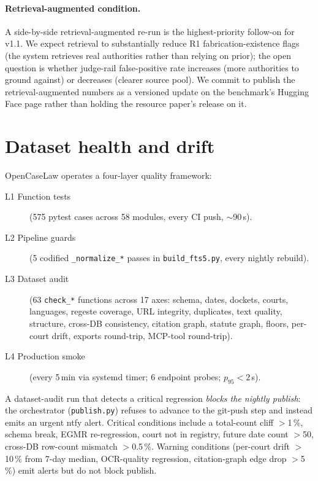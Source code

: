 \documentclass[11pt,a4paper]{article}
\begin{document}
\paragraph{Retrieval-augmented condition.} A side-by-side retrieval-augmented re-run is the highest-priority follow-on for v1.1. We expect retrieval to substantially reduce R1 fabrication-existence flags (the system retrieves real authorities rather than relying on prior); the open question is whether judge-rail false-positive rate increases (more authorities to ground against) or decreases (clearer source pool). We commit to publish the retrieval-augmented numbers as a versioned update on the benchmark's Hugging Face page rather than holding the resource paper's release on it.

\section{Dataset health and drift}\label{sec:qc}

OpenCaseLaw operates a four-layer quality framework:
\begin{description}
\item[L1 Function tests] (575 pytest cases across 58 modules, every CI push, $\sim$90\,s).
\item[L2 Pipeline guards] (5 codified \texttt{\_normalize\_*} passes in \texttt{build\_fts5.py}, every nightly rebuild).
\item[L3 Dataset audit] (63 \texttt{check\_*} functions across 17 axes: schema, dates, dockets, courts, languages, regeste coverage, URL integrity, duplicates, text quality, structure, cross-DB consistency, citation graph, statute graph, floors, per-court drift, exports round-trip, MCP-tool round-trip).
\item[L4 Production smoke] (every 5\,min via systemd timer; 6 endpoint probes; $p_{95}<2$\,s).
\end{description}

A dataset-audit run that detects a critical regression \emph{blocks the nightly publish}: the orchestrator (\texttt{publish.py}) refuses to advance to the git-push step and instead emits an urgent ntfy alert. Critical conditions include a total-count cliff $>$1\,\%, schema break, EGMR re-regression, court not in registry, future date count $>$50, cross-DB row-count mismatch $>$0.5\,\%. Warning conditions (per-court drift $>$10\,\% from 7-day median, OCR-quality regression, citation-graph edge drop $>$5\,\%) emit alerts but do not block publish.
\end{document}
